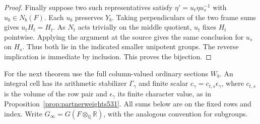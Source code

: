 \documentclass[a4paper,11pt]{article}
\theoremstyle{definition}
\theoremstyle{remark}
\newcommand{\RR}{\mathbb R}\newcommand{\CC}{\mathbb C}\newcommand{\QQ}{\mathbb Q}
\numberwithin{equation}{section}
\begin{document}
\begin{proof}
Finally suppose two such representatives satisfy
\(\eta'=u_t\eta u_s^{-1}\) with \(u_b\in N_b(F)\).
Each \(u_b\) preserves \(Y_b\). Taking perpendiculars of the
two frame sums gives \(u_t H_t=H_t\). As \(N_t\) acts
trivially on the middle quotient, \(u_t\) fixes \(H_t\)
pointwise. Applying the argument at the source gives the
same conclusion for \(u_s\) on \(H_s\). Thus both lie in the
indicated smaller unipotent groups. The reverse implication
is immediate by inclusion. This proves the bijection.
\end{proof}

For the next theorem use the full column-valued ordinary
sections \(W_b\). An integral cell has its arithmetic
stabilizer \(\Gamma_\gamma\) and finite scalar
\(c_\gamma=c_{t,s}\epsilon_\gamma\), where \(c_{t,s}\) is
the volume of the row pair and \(\epsilon_\gamma\) its finite
character value, as in Proposition~\ref{prop:partnerweights531}.
All sums below are on the fixed rows and index. Write
\(G_\infty=G(F\otimes_\QQ\RR)\), with the analogous convention
for subgroups.
\end{document}
